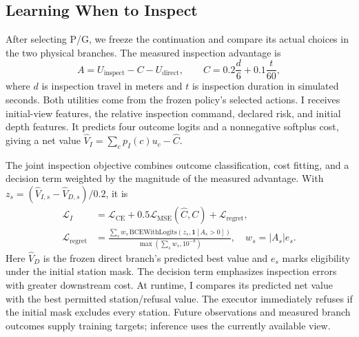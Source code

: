 \subsection{Learning When to Inspect}
After selecting P/G, we freeze the continuation and compare its actual choices
in the two physical branches. The measured inspection advantage is
\begin{equation}
 A=U_{\mathrm{inspect}}-C-U_{\mathrm{direct}},\qquad
 C=0.2\frac{d}{6}+0.1\frac{t}{60},
 \label{eq:advantage}
\end{equation}
where $d$ is inspection travel in meters and $t$ is inspection duration in
simulated seconds. Both utilities come from the frozen policy's selected
actions. I receives initial-view features, the relative inspection command,
declared risk, and initial depth features. It predicts four outcome logits
and a nonnegative softplus cost, giving a net value
$\widehat V_I=\sum_c p_I(c)u_c-\widehat C$.

The joint inspection objective combines outcome classification, cost fitting,
and a decision term weighted by the magnitude of the measured advantage. With
$z_s=(\widehat V_{I,s}-\widehat V_{D,s})/0.2$, it is
\begin{align}
 \mathcal L_I&=\mathcal L_{\mathrm{CE}}
 +0.5\mathcal L_{\mathrm{MSE}}(\widehat C,C)+\mathcal L_{\mathrm{regret}},\\
 \mathcal L_{\mathrm{regret}}&=
 \frac{\sum_s w_s\,\mathrm{BCEWithLogits}
 (z_s,\mathbf 1[A_s>0])}
 {\max(\sum_s w_s,10^{-8})},\quad w_s=|A_s|e_s.
 \label{eq:regret}
\end{align}
Here $\widehat V_D$ is the frozen direct branch's predicted best value and
$e_s$ marks eligibility under the initial station mask. The decision term
emphasizes inspection errors with greater downstream cost. At runtime, I
compares its predicted net value with the best permitted station/refusal
value. The executor immediately refuses if the initial mask excludes every
station. Future observations and measured branch outcomes supply training
targets; inference uses the currently available view.

